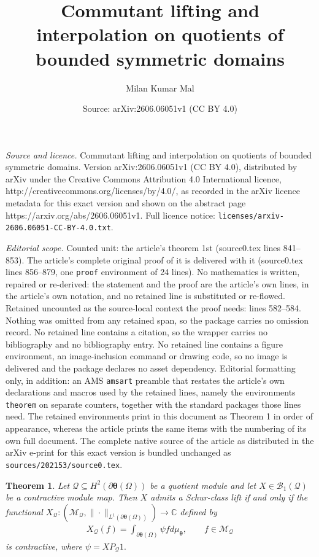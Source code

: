 \documentclass[10pt,a4paper]{amsart}
\title{Commutant lifting and interpolation on quotients of bounded symmetric domains}
\author{Milan Kumar Mal}
\date{Source: arXiv:2606.06051v1 (CC BY 4.0)}
\newtheorem{theorem}{Theorem}
\newcommand{\beq}{\begin{eqnarray}}
\newcommand{\eeq}{\end{eqnarray}}
\begin{document}
\maketitle

\noindent\emph{Source and licence.} Commutant lifting and interpolation on quotients of bounded symmetric domains. Version arXiv:2606.06051v1 (CC BY 4.0), distributed by arXiv under the Creative Commons Attribution 4.0 International licence, http://creativecommons.org/licenses/by/4.0/, as recorded in the arXiv licence metadata for this exact version and shown on the abstract page https://arxiv.org/abs/2606.06051v1. Full licence notice: \texttt{licenses/arxiv-2606.06051-CC-BY-4.0.txt}.\par\smallskip

\noindent\textit{Editorial scope.} Counted unit: the article's theorem 1st (source0.tex lines 841--853). The article's complete original proof of it is delivered with it (source0.tex lines 856--879, one \texttt{proof} environment of 24 lines). No mathematics is written, repaired or re-derived: the statement and the proof are the article's own lines, in the article's own notation, and no retained line is substituted or re-flowed.  Retained uncounted as the source-local context the proof needs: lines 582--584.  Nothing was omitted from any retained span, so the package carries no omission record.  No retained line contains a citation, so the wrapper carries no bibliography and no bibliography entry.  No retained line contains a figure environment, an image-inclusion command or drawing code, so no image is delivered and the package declares no asset dependency.  Editorial formatting only, in addition: an AMS \texttt{amsart} preamble that restates the article's own declarations and macros used by the retained lines, namely the environments \texttt{theorem} on separate counters, together with the standard packages those lines need.  The retained environments print in this document as Theorem 1 in order of appearance, whereas the article prints the same items with the numbering of its own full document.  The complete native source of the article as distributed in the arXiv e-print for this exact version is bundled unchanged as \texttt{sources/202153/source0.tex}.
\begin{theorem}\label{1st characterization}
    Let $\mathcal{Q}\subseteq  H^2(\partial\boldsymbol\theta(\Omega))$ be a quotient module and let $X\in \mathcal{B}_1(\mathcal{Q})$ be a contractive module map. Then $X$ admits a Schur-class lift if and only if the functional $X_{\mathcal{Q}}: \left(\mathcal{M}_{\mathcal{Q}}, \|\cdot\|_{L^1({\partial\boldsymbol\theta(\Omega)})}\right) \to \mathbb C$ defined by \beq \label{eq 11} X_{\mathcal{Q}}(f)=\int_{\partial\boldsymbol\theta(\Omega)}\psi f d\mu_{\boldsymbol\theta},\qquad f\in \mathcal{M}_{\mathcal{Q}}\eeq is contractive, where $\psi=XP_{\mathcal{Q}}1.$
\end{theorem}
\end{document}
